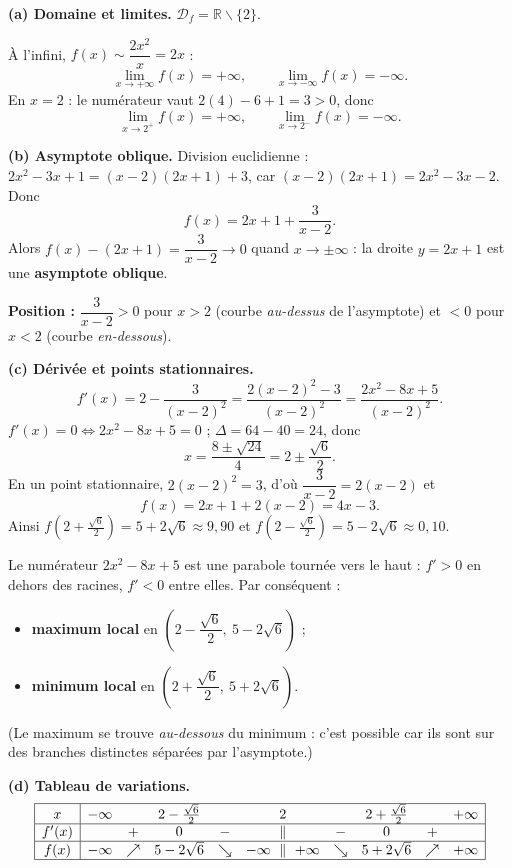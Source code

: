 \documentclass[11pt]{article}
\def\setminus{\mathbin{\backslash}}\let\smallsetminus\setminus
\begin{document}
\begin{corrige}
\textbf{(a) Domaine et limites.} $\mathcal{D}_f = \mathbb{R} \setminus \{2\}$.

À l'infini, $f(x) \sim \dfrac{2x^2}{x} = 2x$ :
\[
\lim_{x \to +\infty} f(x) = +\infty, \qquad \lim_{x \to -\infty} f(x) = -\infty.
\]
En $x = 2$ : le numérateur vaut $2(4) - 6 + 1 = 3 > 0$, donc
\[
\lim_{x \to 2^+} f(x) = +\infty, \qquad \lim_{x \to 2^-} f(x) = -\infty.
\]

\textbf{(b) Asymptote oblique.} Division euclidienne : $2x^2 - 3x + 1 = (x-2)(2x+1) + 3$, car $(x-2)(2x+1) = 2x^2 - 3x - 2$. Donc
\[
f(x) = 2x + 1 + \frac{3}{x-2}.
\]
Alors $f(x) - (2x+1) = \dfrac{3}{x-2} \to 0$ quand $x \to \pm\infty$ : la droite $y = 2x + 1$ est une \textbf{asymptote oblique}.

\textbf{Position :} $\dfrac{3}{x-2} > 0$ pour $x > 2$ (courbe \emph{au-dessus} de l'asymptote) et $< 0$ pour $x < 2$ (courbe \emph{en-dessous}).

\textbf{(c) Dérivée et points stationnaires.}
\[
f'(x) = 2 - \frac{3}{(x-2)^2} = \frac{2(x-2)^2 - 3}{(x-2)^2} = \frac{2x^2 - 8x + 5}{(x-2)^2}.
\]
$f'(x) = 0 \iff 2x^2 - 8x + 5 = 0$ ; $\Delta = 64 - 40 = 24$, donc
\[
x = \frac{8 \pm \sqrt{24}}{4} = 2 \pm \frac{\sqrt{6}}{2}.
\]
En un point stationnaire, $2(x-2)^2 = 3$, d'où $\dfrac{3}{x-2} = 2(x-2)$ et
\[
f(x) = 2x + 1 + 2(x-2) = 4x - 3.
\]
Ainsi $f\!\left(2 + \tfrac{\sqrt6}{2}\right) = 5 + 2\sqrt{6} \approx 9,90$ et $f\!\left(2 - \tfrac{\sqrt6}{2}\right) = 5 - 2\sqrt{6} \approx 0,10$.

Le numérateur $2x^2 - 8x + 5$ est une parabole tournée vers le haut : $f' > 0$ en dehors des racines, $f' < 0$ entre elles. Par conséquent :
\begin{itemize}
    \item \textbf{maximum local} en $\left(2 - \dfrac{\sqrt6}{2},\ 5 - 2\sqrt6\right)$ ;
    \item \textbf{minimum local} en $\left(2 + \dfrac{\sqrt6}{2},\ 5 + 2\sqrt6\right)$.
\end{itemize}
(Le maximum se trouve \emph{au-dessous} du minimum : c'est possible car ils sont sur des branches distinctes séparées par l'asymptote.)

\textbf{(d) Tableau de variations.}
\[
\begin{array}{|c|ccccccccc|}
\hline
x & -\infty & & 2-\frac{\sqrt6}{2} & & 2 & & 2+\frac{\sqrt6}{2} & & +\infty \\
\hline
f'(x) & & + & 0 & - & \parallel & - & 0 & + & \\
\hline
f(x) & -\infty & \nearrow & 5-2\sqrt6 & \searrow & -\infty\ \parallel\ +\infty & \searrow & 5+2\sqrt6 & \nearrow & +\infty \\
\hline
\end{array}
\]


\end{corrige}
\end{document}
